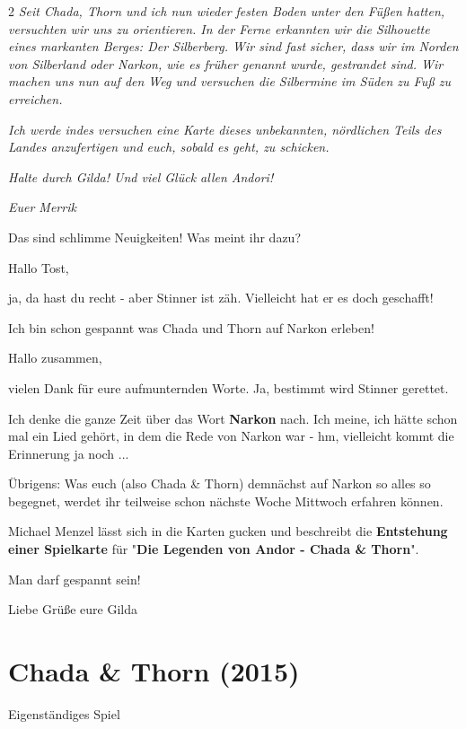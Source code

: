 \documentclass[10pt, a4paper, oneside]{book}
\newcommand{\produkt}[2][]{%
        \section{#2}%
        \label{produkt-#1}%
    }
\newcommand{\fillbreak}{\vspace*{\fill}\columnbreak}
\begin{document}
\begin{multicols}{2}
\textit{Seit Chada, Thorn und ich nun wieder festen Boden unter den Füßen hatten, versuchten wir uns zu orientieren. In der Ferne erkannten wir die Silhouette eines markanten Berges: Der Silberberg. Wir sind fast sicher, dass wir im Norden von Silberland oder Narkon, wie es früher genannt wurde, gestrandet sind. Wir machen uns nun auf den Weg und versuchen die Silbermine im Süden zu Fuß zu erreichen.}

\textit{Ich werde indes versuchen eine Karte dieses unbekannten, nördlichen Teils des Landes anzufertigen und euch, sobald es geht, zu schicken.}

\textit{Halte durch Gilda! Und viel Glück allen Andori!}

\textit{Euer Merrik}

Das sind schlimme Neuigkeiten! Was meint ihr dazu?

Hallo Tost,

ja, da hast du recht - aber Stinner ist zäh. Vielleicht hat er es doch geschafft!

Ich bin schon gespannt was Chada und Thorn auf Narkon erleben!


Hallo zusammen,

vielen Dank für eure aufmunternden Worte. Ja, bestimmt wird Stinner gerettet.

Ich denke die ganze Zeit über das Wort \textbf{Narkon} nach. Ich meine, ich hätte schon mal ein Lied gehört, in dem die Rede von Narkon war - hm, vielleicht kommt die Erinnerung ja noch ...

Übrigens: Was euch (also Chada \& Thorn) demnächst auf Narkon so alles so begegnet, werdet ihr teilweise schon nächste Woche Mittwoch erfahren können.

Michael Menzel lässt sich in die Karten gucken und beschreibt die \textbf{Entstehung einer Spielkarte} für "\textbf{Die Legenden von Andor - Chada \& Thorn}".


Man darf gespannt sein!

Liebe Grüße
eure Gilda













\fillbreak
\produkt[2015-chada-und-thorn]{Chada \& Thorn (2015)}

\begin{center}
    Eigenständiges Spiel
\end{center}


\end{multicols}
\end{document}
